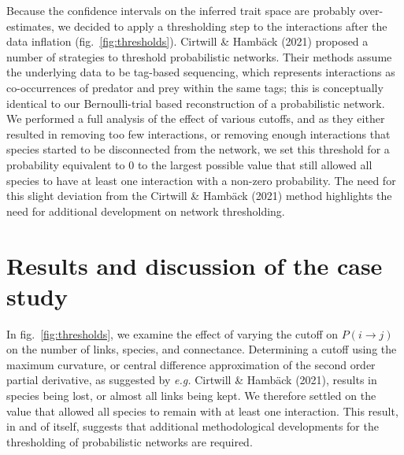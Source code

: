 \documentclass[11pt]{article}
\begin{document}
Because the confidence intervals on the inferred trait space are
probably over-estimates, we decided to apply a thresholding step to the
interactions after the data inflation (fig.~\ref{fig:thresholds}).
Cirtwill \& Hambäck (2021) proposed a number of strategies to threshold
probabilistic networks. Their methods assume the underlying data to be
tag-based sequencing, which represents interactions as co-occurrences of
predator and prey within the same tags; this is conceptually identical
to our Bernoulli-trial based reconstruction of a probabilistic network.
We performed a full analysis of the effect of various cutoffs, and as
they either resulted in removing too few interactions, or removing
enough interactions that species started to be disconnected from the
network, we set this threshold for a probability equivalent to 0 to the
largest possible value that still allowed all species to have at least
one interaction with a non-zero probability. The need for this slight
deviation from the Cirtwill \& Hambäck (2021) method highlights the need
for additional development on network thresholding.

\hypertarget{results-and-discussion-of-the-case-study}{%
\section{Results and discussion of the case
study}\label{results-and-discussion-of-the-case-study}}

In fig.~\ref{fig:thresholds}, we examine the effect of varying the
cutoff on \(P(i \rightarrow j)\) on the number of links, species, and
connectance. Determining a cutoff using the maximum curvature, or
central difference approximation of the second order partial derivative,
as suggested by \emph{e.g.} Cirtwill \& Hambäck (2021), results in
species being lost, or almost all links being kept. We therefore settled
on the value that allowed all species to remain with at least one
interaction. This result, in and of itself, suggests that additional
methodological developments for the thresholding of probabilistic
networks are required.
\end{document}
